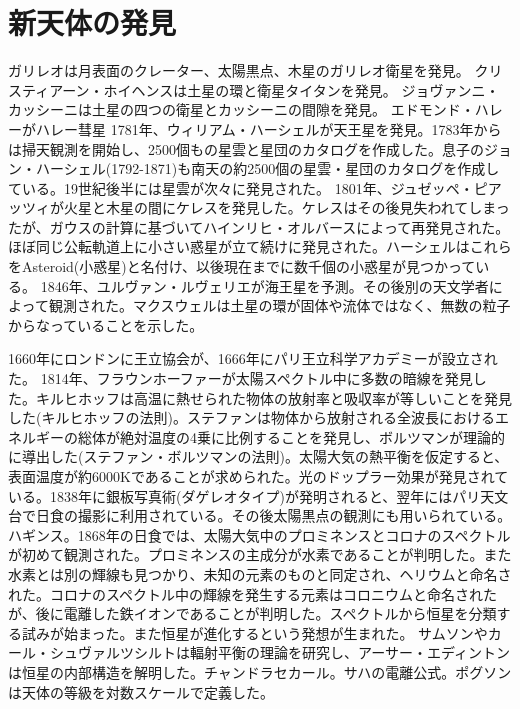 \section{新天体の発見}
	ガリレオは月表面のクレーター、太陽黒点、木星のガリレオ衛星を発見。
	クリスティアーン・ホイヘンスは土星の環と衛星タイタンを発見。
	ジョヴァンニ・カッシーニは土星の四つの衛星とカッシーニの間隙を発見。
	エドモンド・ハレーがハレー彗星
	1781年、ウィリアム・ハーシェルが天王星を発見。1783年からは掃天観測を開始し、2500個もの星雲と星団のカタログを作成した。息子のジョン・ハーシェル(1792-1871)も南天の約2500個の星雲・星団のカタログを作成している。19世紀後半には星雲が次々に発見された。
	1801年、ジュゼッペ・ピアッツィが火星と木星の間にケレスを発見した。ケレスはその後見失われてしまったが、ガウスの計算に基づいてハインリヒ・オルバースによって再発見された。ほぼ同じ公転軌道上に小さい惑星が立て続けに発見された。ハーシェルはこれらをAsteroid(小惑星)と名付け、以後現在までに数千個の小惑星が見つかっている。
	1846年、ユルヴァン・ルヴェリエが海王星を予測。その後別の天文学者によって観測された。マクスウェルは土星の環が固体や流体ではなく、無数の粒子からなっていることを示した。

	1660年にロンドンに王立協会が、1666年にパリ王立科学アカデミーが設立された。
	1814年、フラウンホーファーが太陽スペクトル中に多数の暗線を発見した。キルヒホッフは高温に熱せられた物体の放射率と吸収率が等しいことを発見した(キルヒホッフの法則)。ステファンは物体から放射される全波長におけるエネルギーの総体が絶対温度の4乗に比例することを発見し、ボルツマンが理論的に導出した(ステファン・ボルツマンの法則)。太陽大気の熱平衡を仮定すると、表面温度が約6000Kであることが求められた。光のドップラー効果が発見されている。1838年に銀板写真術(ダゲレオタイプ)が発明されると、翌年にはパリ天文台で日食の撮影に利用されている。その後太陽黒点の観測にも用いられている。ハギンス。1868年の日食では、太陽大気中のプロミネンスとコロナのスペクトルが初めて観測された。プロミネンスの主成分が水素であることが判明した。また水素とは別の輝線も見つかり、未知の元素のものと同定され、ヘリウムと命名された。コロナのスペクトル中の輝線を発生する元素はコロニウムと命名されたが、後に電離した鉄イオンであることが判明した。スペクトルから恒星を分類する試みが始まった。また恒星が進化するという発想が生まれた。
	サムソンやカール・シュヴァルツシルトは輻射平衡の理論を研究し、アーサー・エディントンは恒星の内部構造を解明した。チャンドラセカール。サハの電離公式。ポグソンは天体の等級を対数スケールで定義した。